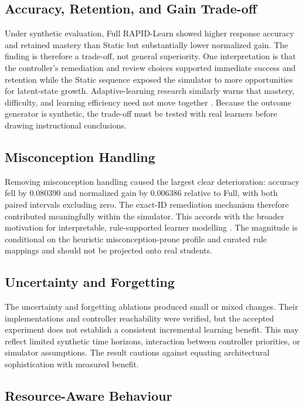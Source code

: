 \documentclass[conference]{IEEEtran}
\begin{document}
\subsection{Accuracy, Retention, and Gain Trade-off}

Under synthetic evaluation, Full RAPID-Learn showed higher response accuracy
and retained mastery than Static but substantially lower normalized gain. The
finding is therefore a trade-off, not general superiority. One interpretation
is that the controller's remediation and review choices supported immediate
success and retention while the Static sequence exposed the simulator to more
opportunities for latent-state growth. Adaptive-learning research similarly
warns that mastery, difficulty, and learning efficiency need not move together
\cite{pelanek2025hard,tan2025}. Because the outcome generator is synthetic,
the trade-off must be tested with real learners before drawing instructional
conclusions.

\subsection{Misconception Handling}

Removing misconception handling caused the largest clear deterioration:
accuracy fell by 0.080390 and normalized gain by 0.006386 relative to Full,
with both paired intervals excluding zero. The exact-ID remediation mechanism
therefore contributed meaningfully within the simulator. This accords with the
broader motivation for interpretable, rule-supported learner modelling
\cite{pelanek2024rules,sajja2025}. The magnitude is conditional on the
heuristic misconception-prone profile and curated rule mappings and should not
be projected onto real students.

\subsection{Uncertainty and Forgetting}

The uncertainty and forgetting ablations produced small or mixed changes.
Their implementations and controller reachability were verified, but the
accepted experiment does not establish a consistent incremental learning
benefit. This may reflect limited synthetic time horizons, interaction between
controller priorities, or simulator assumptions. The result cautions against
equating architectural sophistication with measured benefit.

\subsection{Resource-Aware Behaviour}
\end{document}
